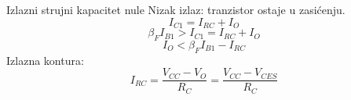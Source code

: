 \begin{frame}[label=10-s025]{Izlazni strujni kapacitet nule}
\setlength{\abovedisplayskip}{4pt}\setlength{\belowdisplayskip}{4pt}\setlength{\abovedisplayshortskip}{3pt}\setlength{\belowdisplayshortskip}{3pt}
Nizak izlaz: tranzistor ostaje u zasićenju.
\[I_{C1}=I_{RC}+I_O\]
\[\beta_FI_{B1}>I_{C1}=I_{RC}+I_O\]
\[I_O<\beta_FI_{B1}-I_{RC}\]
Izlazna kontura:
\[I_{RC}=\frac{V_{CC}-V_O}{R_C}=\frac{V_{CC}-V_{CES}}{R_C}\]
\end{frame}
